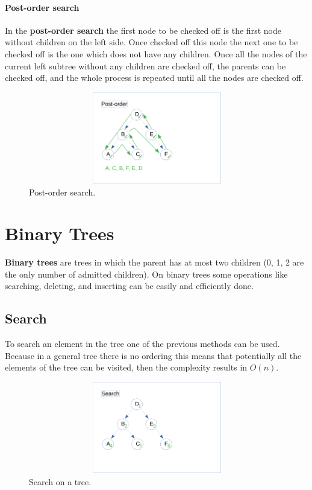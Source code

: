 \paragraph{Post-order search}
In the \textbf{post-order search} the first node to be checked off is the first node without children on the left side. Once checked off this node the next one to be checked off is the one which does not have any children. Once all the nodes of the current left subtree without any children are checked off, the parents can be checked off, and the whole process is repeated until all the nodes are checked off.

\begin{figure}[hb]
	\includegraphics[width=12cm,height=4cm]{chapters/trees/images/trees_7.pdf}
	\caption[]{Post-order search.}
	\label{trees_7}
\end{figure}

\section{Binary Trees}
\textbf{Binary trees} are trees in which the parent has at most two children (0, 1, 2 are the only number of admitted children). On binary trees some operations like searching, deleting, and inserting can be easily and efficiently done. 
\subsection{Search}
To search an element in the tree one of the previous methods can be used. Because in a general tree there is no ordering this means that potentially all the elements of the tree can be visited, then the complexity results in \(O(n)\).

\begin{figure}[hb]
	\includegraphics[width=12cm,height=4cm]{chapters/trees/images/trees_8.pdf}
	\caption[]{Search on a tree.}
	\label{trees_8}
\end{figure}

